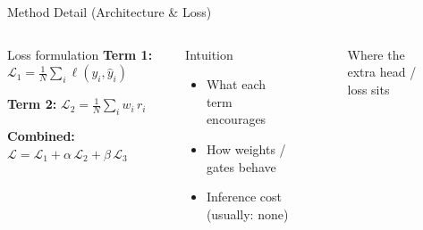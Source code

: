 \documentclass[9pt,aspectratio=169]{beamer}
\begin{document}
\begin{frame}{Method Detail (Architecture \& Loss)}
  \begin{columns}[T,onlytextwidth]
      \begin{block}{Loss formulation}
        \textbf{Term 1:}
        $\displaystyle \mathcal{L}_{1}=\frac{1}{N}\sum_{i} \ell(y_i, \hat{y}_i)$

        \textbf{Term 2:}
        $\displaystyle \mathcal{L}_{2}=\frac{1}{N}\sum_{i} w_i\, r_i$

        \textbf{Combined:}
        $\displaystyle \mathcal{L}=\mathcal{L}_{1}+\alpha\,\mathcal{L}_{2}+\beta\,\mathcal{L}_{3}$
      \end{block}

      \begin{block}{Intuition}
        \begin{itemize}
          \item What each term encourages
          \item How weights / gates behave
          \item Inference cost (usually: none)
        \end{itemize}
      \end{block}

      \begin{block}{}
        \begin{figure}
          \centering
          \vspace{-1.0em}
          \caption{Where the extra head / loss sits}
          \vspace{-1.2em}
        \end{figure}
      \end{block}
  \end{columns}
\end{frame}
\end{document}

